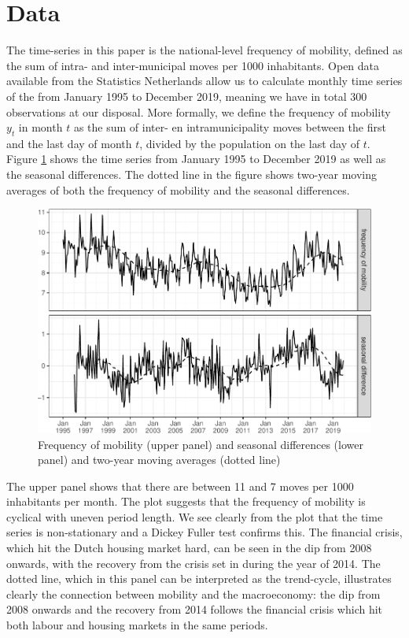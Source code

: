 \documentclass[12pt, a4paper]{article}
\begin{document}
\section{Data}\label{data}

The time-series in this paper is the national-level frequency of
mobility, defined as the sum of intra- and inter-municipal moves per
1000 inhabitants. Open data available from the Statistics Netherlands
allow us to calculate monthly time series of the from January 1995 to
December 2019, meaning we have in total 300 observations at our
disposal. More formally, we define the frequency of mobility $y_{t}$
in month $t$ as the sum of inter- en intramunicipality moves between the
first and the last day of month $t$, divided by the population on the
last day of $t$. Figure \ref{fig:freq-plot} shows the time series from January
1995 to December 2019 as well as the seasonal differences. The dotted line in the figure shows
two-year moving averages of both the frequency of mobility and the
seasonal differences.

\begin{figure}[H]
\caption{\label{fig:freq-plot}Frequency of mobility (upper panel) and
seasonal differences (lower panel) and two-year moving averages (dotted
line)}
\centering
\includegraphics[scale = 0.8]{../figs/freq--freq-plot-1.pdf}
\end{figure}

The upper panel shows that there are between 11 and 7 moves per 1000
inhabitants per month. The plot suggests that the frequency of mobility
is cyclical with uneven period length. We see clearly from the plot that
the time series is non-stationary and a Dickey Fuller test confirms
this. The financial crisis, which hit the Dutch housing market hard, can
be seen in the dip from 2008 onwards, with the recovery from the crisis
set in during the year of 2014. The dotted line, which in this panel can
be interpreted as the trend-cycle, illustrates clearly the connection
between mobility and the macroeconomy: the dip from 2008 onwards and the
recovery from 2014 follows the financial crisis which hit both labour
and housing markets in the same periods.
\end{document}
